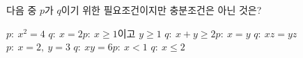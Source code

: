 다음 중 $p$가 $q$이기 위한 필요조건이지만 충분조건은 아닌 것은? 
\begin{choicesv}{$p:\ x^2=4$ \hspace{3em} $q:\ x=2$}{$p:\ x\ge 1$이고 $y\ge 1$ \hspace{3em} $q:\ x+y\ge 2$}{$p:\ x=y$ \hspace{3em} $q:\ xz=yz$}{$p:\ x=2,\ y=3$ \hspace{3em} $q:\ xy=6$}{$p:\ x<1$ \hspace{3em} $q:\ x\le 2$}\end{choicesv}
